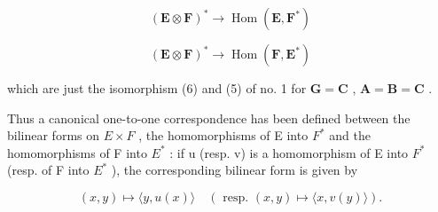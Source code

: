 \[
(\mathbf {E} \otimes \mathbf {F}) ^ {*} \rightarrow \operatorname{Hom} (\mathbf {E}, \mathbf {F} ^ {*})\tag{29}
\]

\[
(\mathbf {E} \otimes \mathbf {F}) ^ {*} \rightarrow \operatorname{Hom} (\mathbf {F}, \mathbf {E} ^ {*})
\]

which are just the isomorphism (6) and (5) of no. 1 for \(\mathbf{G} = \mathbf{C}\) , \(\mathbf{A} = \mathbf{B} = \mathbf{C}\) .

Thus a canonical one-to-one correspondence has been defined between the bilinear forms on \(E \times F\) , the homomorphisms of E into \(F^{*}\) and the homomorphisms of F into \(E^{*}\) : if u (resp. v) is a homomorphism of E into \(F^{*}\) (resp. of F into \(E^{*}\) ), the corresponding bilinear form is given by

\[
(x, y) \mapsto \langle y, u (x) \rangle \quad (\text { resp. } (x, y) \mapsto \langle x, v (y) \rangle).
\]

